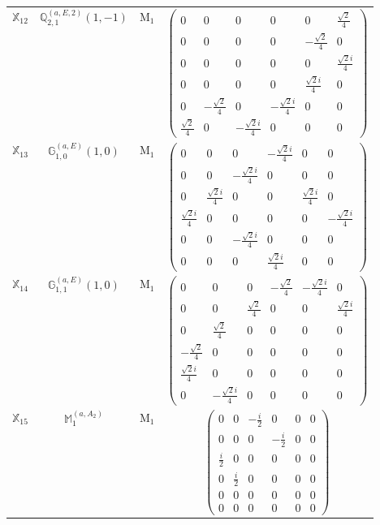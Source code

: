 \documentclass[fleqn,10pt,landscape]{article}
\begin{document}
\begin{itemize}
\begin{center}
\begin{longtable}{c|c|c|c}
$ \mathbb{X}_{12} $ & $\mathbb{Q}_{2,1}^{(a,E,2)}(1,-1)$ & M$_{1}$ & $\begin{pmatrix} 0 & 0 & 0 & 0 & 0 & \frac{\sqrt{2}}{4} \\ 0 & 0 & 0 & 0 & - \frac{\sqrt{2}}{4} & 0 \\ 0 & 0 & 0 & 0 & 0 & \frac{\sqrt{2} i}{4} \\ 0 & 0 & 0 & 0 & \frac{\sqrt{2} i}{4} & 0 \\ 0 & - \frac{\sqrt{2}}{4} & 0 & - \frac{\sqrt{2} i}{4} & 0 & 0 \\ \frac{\sqrt{2}}{4} & 0 & - \frac{\sqrt{2} i}{4} & 0 & 0 & 0 \end{pmatrix}$ \\
$ \mathbb{X}_{13} $ & $\mathbb{G}_{1,0}^{(a,E)}(1,0)$ & M$_{1}$ & $\begin{pmatrix} 0 & 0 & 0 & - \frac{\sqrt{2} i}{4} & 0 & 0 \\ 0 & 0 & - \frac{\sqrt{2} i}{4} & 0 & 0 & 0 \\ 0 & \frac{\sqrt{2} i}{4} & 0 & 0 & \frac{\sqrt{2} i}{4} & 0 \\ \frac{\sqrt{2} i}{4} & 0 & 0 & 0 & 0 & - \frac{\sqrt{2} i}{4} \\ 0 & 0 & - \frac{\sqrt{2} i}{4} & 0 & 0 & 0 \\ 0 & 0 & 0 & \frac{\sqrt{2} i}{4} & 0 & 0 \end{pmatrix}$ \\
$ \mathbb{X}_{14} $ & $\mathbb{G}_{1,1}^{(a,E)}(1,0)$ & M$_{1}$ & $\begin{pmatrix} 0 & 0 & 0 & - \frac{\sqrt{2}}{4} & - \frac{\sqrt{2} i}{4} & 0 \\ 0 & 0 & \frac{\sqrt{2}}{4} & 0 & 0 & \frac{\sqrt{2} i}{4} \\ 0 & \frac{\sqrt{2}}{4} & 0 & 0 & 0 & 0 \\ - \frac{\sqrt{2}}{4} & 0 & 0 & 0 & 0 & 0 \\ \frac{\sqrt{2} i}{4} & 0 & 0 & 0 & 0 & 0 \\ 0 & - \frac{\sqrt{2} i}{4} & 0 & 0 & 0 & 0 \end{pmatrix}$ \\
$ \mathbb{X}_{15} $ & $\mathbb{M}_{1}^{(a,A_{2})}$ & M$_{1}$ & $\begin{pmatrix} 0 & 0 & - \frac{i}{2} & 0 & 0 & 0 \\ 0 & 0 & 0 & - \frac{i}{2} & 0 & 0 \\ \frac{i}{2} & 0 & 0 & 0 & 0 & 0 \\ 0 & \frac{i}{2} & 0 & 0 & 0 & 0 \\ 0 & 0 & 0 & 0 & 0 & 0 \\ 0 & 0 & 0 & 0 & 0 & 0 \end{pmatrix}$ \\

\end{longtable}
\end{center}
\end{itemize}
\end{document}
